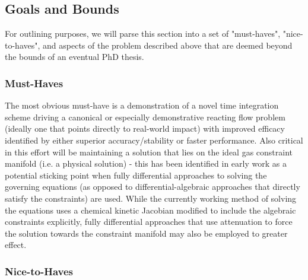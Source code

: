 \subsection{Goals and Bounds}

For outlining purposes, we will parse this section into a set of "must-haves",
"nice-to-haves", and aspects of the problem described above that are deemed
beyond the bounds of an eventual PhD thesis.

\subsubsection{Must-Haves}

The most obvious must-have is a demonstration of a novel time integration
scheme driving a canonical or especially demonstrative reacting flow problem
(ideally one that points directly to real-world impact) with improved efficacy
identified by either superior accuracy/stability or faster performance. Also
critical in this effort will be maintaining a solution that lies on the ideal
gas constraint manifold (i.e. a physical solution) - this has been identified
in early work as a potential sticking point when fully differential approaches
to solving the governing equations (as opposed to differential-algebraic approaches
that directly satisfy the constraints) are used. While the currently working
method of solving the equations uses a chemical kinetic Jacobian modified
to include the algebraic constraints explicitly, fully differential approaches
that use attenuation to force the solution towards the constraint manifold may
also be employed to greater effect.

\subsubsection{Nice-to-Haves}

